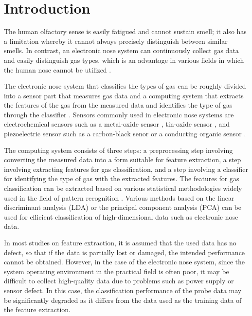 \documentclass[10pt,letterpaper]{article}
\begin{document}
\section*{Introduction}
The human olfactory sense is easily fatigued and cannot sustain smell; it also has a limitation whereby it cannot always precisely distinguish between similar smells. 
In contrast, an electronic nose system can continuously collect gas data and easily distinguish gas types, which is an advantage in various fields in which the human nose cannot be utilized \cite{berna2009bio,fonollosa2012quality}.

The electronic nose system that classifies the types of gas can be roughly divided into a sensor part that measures gas data and a computing system that extracts the features of the gas from the measured data and identifies the type of gas through the classifier \cite{ampuero2003electronic,gardner1994brief}. 
Sensors commonly used in electronic nose systems are electrochemical sensors such as a metal-oxide sensor \cite{barsan2007metal}, tin-oxide sensor \cite{watson1984tin}, and piezoelectric sensor such as a carbon-black senor \cite{kim2005portable} or a conducting organic sensor \cite{janata2003conducting}.

The computing system consists of three steps: a preprocessing step involving converting the measured data into a form suitable for feature extraction, a step involving extracting features for gas classification, and a step involving a classifier for identifying the type of gas with the extracted features. 
The features for gas classification can be extracted based on various statistical methodologies widely used in the field of pattern recognition \cite{belhumeur1997eigenfaces,fukunaga2013introduction,wang2007reconstruction}. 
Various methods based on the linear discriminant analysis (LDA) \cite{belhumeur1997eigenfaces,martinez2001pca,kim2007discriminant} or the principal component analysis (PCA) \cite{fukunaga2013introduction,turk1991eigenfaces,vergara2012chemical} can be used for efficient classification of high-dimensional data such as electronic nose data.

In most studies on feature extraction, it is assumed that the used data has no defect, so that if the data is partially lost or damaged, the intended performance cannot be obtained. 
However, in the case of the electronic nose system, since the system operating environment in the practical field is often poor, it may be difficult to collect high-quality data due to problems such as power supply or sensor defect. 
In this case, the classification performance of the probe data may be significantly degraded as it differs from the data used as the training data of the feature extraction. 
\end{document}
